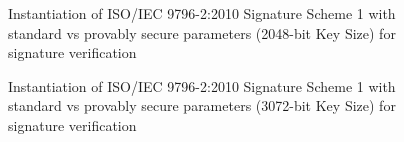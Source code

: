 \documentclass[]{final_report}
\theoremstyle{definition}
\begin{document}
\begin{figure}[H]
    \centering %
     \caption{Instantiation of ISO/IEC 9796-2:2010 Signature Scheme 1 with standard vs provably secure parameters (2048-bit Key Size) for signature verification}
    \begin{minipage}{\textwidth}
        \centering
    \end{minipage}
           \label{iso_verify_2048bit_table}
  \end{figure}
  
\begin{figure}[H]
    \centering %
     \caption{Instantiation of ISO/IEC 9796-2:2010 Signature Scheme 1 with standard vs provably secure parameters (3072-bit Key Size) for signature verification}
    \begin{minipage}{\textwidth}
        \centering
    \end{minipage}
          \label{iso_verify_3072bit_table}
\end{figure}
\end{document}
